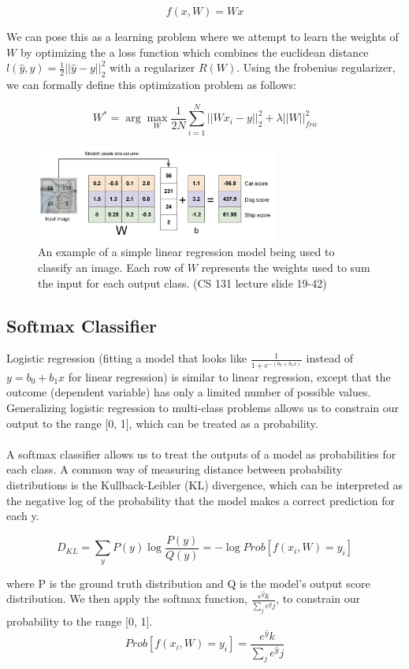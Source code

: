 ﻿\documentclass{article}
\begin{document}
$$f(x, W) = Wx$$

We can pose this as a learning problem where we attempt to learn the weights of $W$ by optimizing the a loss function which combines the euclidean distance $l(\hat{y},y) = \frac{1}{2} ||\hat{y} - y||_2^2$ with a regularizer $R(W)$. Using the frobenius regularizer, we can formally define this optimization problem as follows:

$$W^* = \arg\max_{W} \frac{1}{2N} \sum_{i=1}^{N} ||Wx_i - y||_2^2 + \lambda ||W||_{fro}^2$$

\begin{figure}[h]
\includegraphics[width=8cm]{Linear_regression.png}
\centering
\caption{An example of a simple linear regression model being used to classify an image. Each row of $W$ represents the weights used to sum the input for each output class. (CS 131 lecture slide 19-42)}
\end{figure}
\subsection{Softmax Classifier}
Logistic regression (fitting a model that looks like $\frac{1}{1 + e^{-(b_0 + b_1x)}}$ instead of $y = b_0 + b_1x$ for linear regression) is similar to linear regression, except that the outcome (dependent variable) has only a limited number of possible values. Generalizing logistic regression to multi-class problems allows us to constrain our output to the range [0, 1], which can be treated as a probability.\\
\\
A softmax classifier allows us to treat the outputs of a model as probabilities for each class. A common way of measuring distance between probability distributions is the Kullback-Leibler (KL) divergence, which can be interpreted as the negative log of the probability that the model makes a correct prediction for each y.

$$D_{KL} = \sum_y P(y) \log{\frac{P(y)}{Q(y)}} = - \log{Prob[f(x_i, W) = y_i]}$$

where P is the ground truth distribution and Q is the model's output score distribution. We then apply the softmax function, $\frac{e^{\hat{y}}k}{\sum_j e^{\hat{y}}j } $, to constrain our probability to the range [0, 1].
$$Prob[f(x_i, W) = y_i] = \frac{e^{\hat{y}}k}{\sum_j e^{\hat{y}}j } $$
\end{document}
